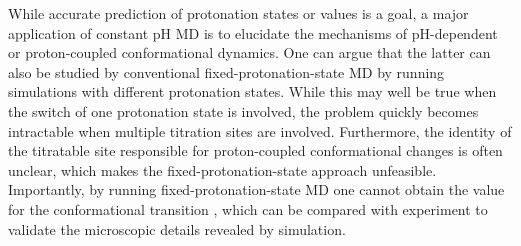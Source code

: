 While accurate prediction of protonation states or {\pka} values is a goal, a major application of constant pH MD is to elucidate the mechanisms of pH-dependent or proton-coupled conformational dynamics. 
One can argue that the latter can also be studied by conventional fixed-protonation-state MD by running simulations with different protonation states.
While this may well be true when the switch of one protonation state is involved, the problem quickly becomes intractable 
when multiple titration sites are involved.
Furthermore,
the identity of the titratable site responsible for proton-coupled conformational changes is
often unclear, which makes the fixed-protonation-state approach unfeasible.
Importantly, by running fixed-protonation-state MD one cannot obtain the {\pka} value for the conformational transition \cite{Wallace_Shen_2012_J.Phys.Chem.Lett.,Huang_Shen_2016_Nat.Commun.,Yue_Shen_2017_J.Chem.TheoryComput.,Henderson_Shen_2020_Proc.Natl.Acad.Sci.USA}, 
which can be compared with experiment to validate the microscopic details revealed by simulation.

